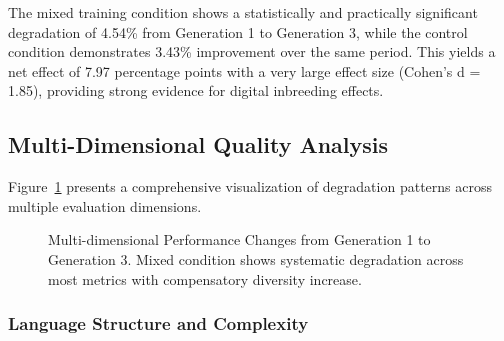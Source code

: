 \documentclass[11pt]{article}
\begin{document}
The mixed training condition shows a statistically and practically significant degradation of 4.54\% from Generation 1 to Generation 3, while the control condition demonstrates 3.43\% improvement over the same period. This yields a net effect of 7.97 percentage points with a very large effect size (Cohen's d = 1.85), providing strong evidence for digital inbreeding effects.

\subsection{Multi-Dimensional Quality Analysis}

Figure~\ref{fig:multi_metrics} presents a comprehensive visualization of degradation patterns across multiple evaluation dimensions.

\begin{figure}[H]
\centering
{}
\caption{Multi-dimensional Performance Changes from Generation 1 to Generation 3. Mixed condition shows systematic degradation across most metrics with compensatory diversity increase.}
\label{fig:multi_metrics}
\end{figure}

\subsubsection{Language Structure and Complexity}
\end{document}
